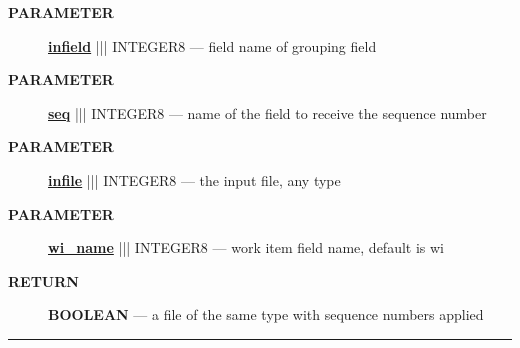 \par
\begin{description}
\item [\colorbox{tagtype}{\color{white} \textbf{\textsf{PARAMETER}}}] \textbf{\underline{infield}} ||| INTEGER8 --- field name of grouping field
\item [\colorbox{tagtype}{\color{white} \textbf{\textsf{PARAMETER}}}] \textbf{\underline{seq}} ||| INTEGER8 --- name of the field to receive the sequence number
\item [\colorbox{tagtype}{\color{white} \textbf{\textsf{PARAMETER}}}] \textbf{\underline{infile}} ||| INTEGER8 --- the input file, any type
\item [\colorbox{tagtype}{\color{white} \textbf{\textsf{PARAMETER}}}] \textbf{\underline{wi\_name}} ||| INTEGER8 --- work item field name, default is wi
\end{description}







\par
\begin{description}
\item [\colorbox{tagtype}{\color{white} \textbf{\textsf{RETURN}}}] \textbf{BOOLEAN} --- a file of the same type with sequence numbers applied
\end{description}




\rule{\linewidth}{0.5pt}
